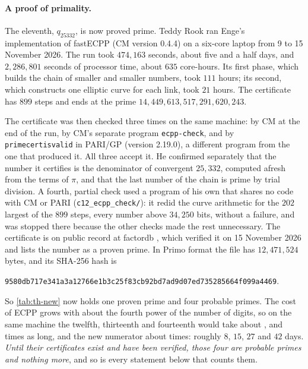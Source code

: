 \paragraph{A proof of primality.} The eleventh, $q_{25332}$, is now proved prime. \addedon{\revG} Teddy Rook ran Enge's implementation of fastECPP \citep{Enge2024} (CM version 0.4.4) on a six-core laptop from 9 to 15 November 2026. The run took $474{,}163$ seconds, about five and a half days, and $2{,}286{,}801$ seconds of processor time, about $635$ core-hours. Its first phase, which builds the chain of smaller and smaller numbers, took $111$ hours; its second, which constructs one elliptic curve for each link, took $21$ hours. The certificate has $899$ steps and ends at the prime $14{,}449{,}613{,}517{,}291{,}620{,}243$.

The certificate was then checked three times on the same machine: by CM at the end of the run, by CM's separate program \texttt{ecpp-check}, and by \texttt{primecertisvalid} in PARI/GP (version 2.19.0), a different program from the one that produced it. All three accept it. He confirmed separately that the number it certifies is the denominator of convergent $25{,}332$, computed afresh from the terms of $\pi$, and that the last number of the chain is prime by trial division. A fourth, partial check used a program of his own that shares no code with CM or PARI (\texttt{c12\_ecpp\_check/}): it redid the curve arithmetic for the $202$ largest of the $899$ steps, every number above $34{,}250$ bits, without a failure, and was stopped there because the other checks made the rest unnecessary. The certificate is on public record at factordb \citep{FactorDBq25332}, which verified it on 15 November 2026 and lists the number as a proven prime. In Primo format the file has $12{,}471{,}524$ bytes, and its SHA-256 hash is
\begin{center}\texttt{\footnotesize 9580db717e341a3a12766e1b3c25f83cb92bd7ad9d07ed735285664f099a4469}.\end{center}

So \cref{tab:th-new} now holds one proven prime and four probable primes. The cost of ECPP grows with about the fourth power of the number of digits, so on the same machine the twelfth, thirteenth and fourteenth would take about \TwEcpp, \TtEcpp{} and \FoEcpp{} times as long, and the new numerator about \FiEcpp{} times: roughly $8$, $15$, $27$ and $42$ days. \emph{Until their certificates exist and have been verified, those four are probable primes and nothing more}, and so is every statement below that counts them.

